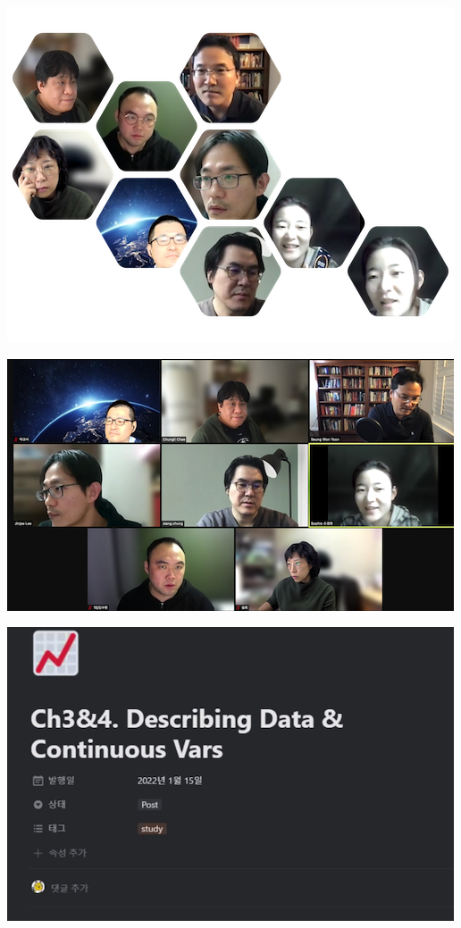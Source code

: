 \documentclass[
]{book}
\begin{document}
\includegraphics{img/s2/3.png}

\includegraphics{img/s2/1.png}

\includegraphics{img/s2/2.png}

\printbibliography
\end{document}
